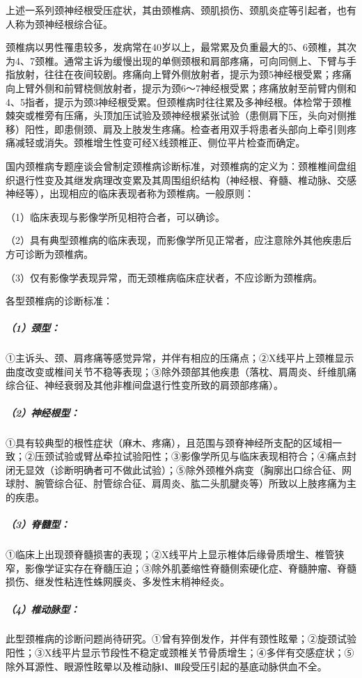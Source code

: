 上述一系列颈神经根受压症状，其由颈椎病、颈肌损伤、颈肌炎症等引起者，也有人称为颈神经根综合征。

颈椎病以男性罹患较多，发病常在40岁以上，最常累及负重最大的5、6颈椎，其次为4、7颈椎。通常主诉为缓慢出现的单侧颈根和肩部疼痛，可向同侧上、下臂与手指放射，往往在夜间较剧。疼痛向上臂外侧放射者，提示为颈5神经根受累；疼痛向上臂外侧和前臂桡侧放射者，提示为颈6～7神经根受累；疼痛放射至前臂内侧和4、5指者，提示为颈3神经根受累。但颈椎病时往往累及多神经根。体检常于颈椎棘突或椎旁有压痛，头顶加压试验及颈神经根紧张试验（患侧肩下压，头向对侧推移）阳性，即患侧颈、肩及上肢发生疼痛。检查者用双手将患者头部向上牵引则疼痛减轻或消失。颈椎增生性变可经X线颈椎正、侧位平片检查而确定。

国内颈椎病专题座谈会曾制定颈椎病诊断标准，对颈椎病的定义为：颈椎椎间盘组织退行性变及其继发病理改变累及其周围组织结构（神经根、脊髓、椎动脉、交感神经等），出现相应的临床表现者称为颈椎病。一般原则：

（1）临床表现与影像学所见相符合者，可以确诊。

（2）具有典型颈椎病的临床表现，而影像学所见正常者，应注意除外其他疾患后方可诊断为颈椎病。

（3）仅有影像学表现异常，而无颈椎病临床症状者，不应诊断为颈椎病。

各型颈椎病的诊断标准：

\subparagraph{（1）颈型：}

①主诉头、颈、肩疼痛等感觉异常，并伴有相应的压痛点；②X线平片上颈椎显示曲度改变或椎间关节不稳等表现；③除外颈部其他疾患（落枕、肩周炎、纤维肌痛综合征、神经衰弱及其他非椎间盘退行性变所致的肩颈部疼痛）。

\subparagraph{（2）神经根型：}

①具有较典型的根性症状（麻木、疼痛），且范围与颈脊神经所支配的区域相一致；②压颈试验或臂丛牵拉试验阳性；③影像学所见与临床表现相符合；④痛点封闭无显效（诊断明确者可不做此试验）；⑤除外颈椎外病变（胸廓出口综合征、网球肘、腕管综合征、肘管综合征、肩周炎、肱二头肌腱炎等）所致以上肢疼痛为主的疾患。

\subparagraph{（3）脊髓型：}

①临床上出现颈脊髓损害的表现；②X线平片上显示椎体后缘骨质增生、椎管狭窄，影像学证实存在脊髓压迫；③除外肌萎缩性脊髓侧索硬化症、脊髓肿瘤、脊髓损伤、继发性粘连性蛛网膜炎、多发性末梢神经炎。

\subparagraph{（4）椎动脉型：}

此型颈椎病的诊断问题尚待研究。①曾有猝倒发作，并伴有颈性眩晕；②旋颈试验阳性；③X线平片显示节段性不稳定或颈椎关节骨质增生；④多伴有交感症状；⑤除外耳源性、眼源性眩晕以及椎动脉Ⅰ、Ⅲ段受压引起的基底动脉供血不全。

